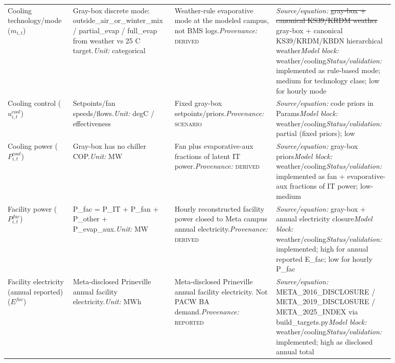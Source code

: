 \documentclass[11pt]{article}
\newcommand{\oldtxt}[1]{\textcolor{blue!70!black}{\sout{#1}}}
\newcommand{\latesttxt}[1]{\textcolor{purple!85!black}{#1}}
\newcommand{\Reported}{\textsc{reported}}
\newcommand{\Derived}{\textsc{derived}}
\newcommand{\Scenario}{\textsc{scenario}}
\begin{document}
\begin{longtable}{@{}p{0.16\linewidth}p{0.22\linewidth}p{0.24\linewidth}p{0.26\linewidth}@{}}
Cooling technology/mode ($m_{i,t}$) & Gray-box discrete mode: outside\_air\_or\_winter\_mix / partial\_evap / full\_evap from weather vs 25 C target.\newline \textit{Unit:} categorical & Weather-rule evaporative mode at the modeled campus, not BMS logs.\newline \textit{Provenance:} \Derived{} & \textit{Source/equation:} \oldtxt{gray-box + canonical KS39/KRDM weather} \latesttxt{gray-box + canonical KS39/KRDM/KBDN hierarchical weather}\newline \textit{Model block:} weather/cooling\newline \textit{Status/validation:} implemented as rule-based mode; medium for technology class; low for hourly mode\\
Cooling control ($u^{cool}_{i,t}$) & Setpoints/fan speeds/flows.\newline \textit{Unit:} degC / effectiveness & Fixed gray-box setpoints/priors.\newline \textit{Provenance:} \Scenario{} & \textit{Source/equation:} code priors in Params\newline \textit{Model block:} weather/cooling\newline \textit{Status/validation:} partial (fixed priors); low\\
Cooling power ($P^{cool}_{i,t}$) & Gray-box has no chiller COP.\newline \textit{Unit:} MW & Fan plus evaporative-aux fractions of latent IT power.\newline \textit{Provenance:} \Derived{} & \textit{Source/equation:} gray-box priors\newline \textit{Model block:} weather/cooling\newline \textit{Status/validation:} implemented as fan + evaporative-aux fractions of IT power; low-medium\\
Facility power ($P^{fac}_{i,t}$) & P\_fac = P\_IT + P\_fan + P\_other + P\_evap\_aux.\newline \textit{Unit:} MW & Hourly reconstructed facility power closed to Meta campus annual electricity.\newline \textit{Provenance:} \Derived{} & \textit{Source/equation:} gray-box + annual electricity closure\newline \textit{Model block:} weather/cooling\newline \textit{Status/validation:} implemented; high for annual reported E\_fac; low for hourly P\_fac\\
Facility electricity (annual reported) ($E^{fac}$) & Meta-disclosed Prineville annual facility electricity.\newline \textit{Unit:} MWh & Meta-disclosed Prineville annual facility electricity. Not PACW BA demand.\newline \textit{Provenance:} \Reported{} & \textit{Source/equation:} META\_2016\_DISCLOSURE / META\_2019\_DISCLOSURE / META\_2025\_INDEX via build\_targets.py\newline \textit{Model block:} weather/cooling\newline \textit{Status/validation:} implemented; high as disclosed annual total\\

\end{longtable}
\end{document}
